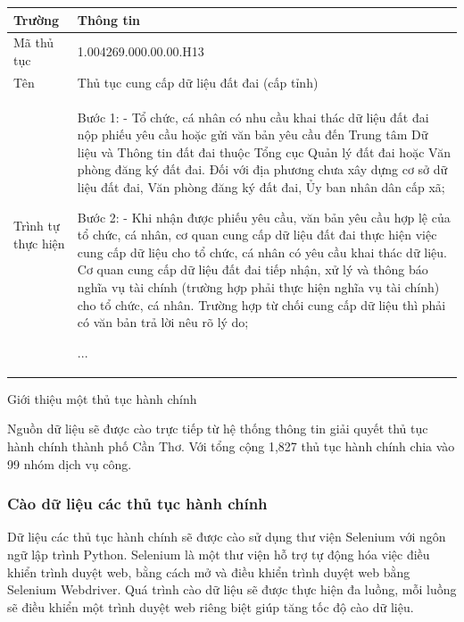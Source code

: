 \documentclass[a4paper, 12pt, openany]{book}
\begin{document}
\vspace{0.5cm}
\begin{minipage}{14cm}
    \begin{center}
        \begin{tabular}{ | m{3cm} | m{11cm}| } 
        \cline{1-2} 
        \hline
        \textbf{Trường} & \textbf{Thông tin}\\
        \hline Mã thủ tục & 1.004269.000.00.00.H13 \\
        \hline Tên & Thủ tục cung cấp dữ liệu đất đai (cấp tỉnh) \\
        \hline Trình tự thực hiện & 
                Bước 1:
                - Tổ chức, cá nhân có nhu cầu khai thác dữ liệu đất đai nộp phiếu yêu cầu hoặc gửi văn bản yêu cầu đến Trung tâm Dữ liệu và Thông tin đất đai thuộc Tổng cục Quản lý đất đai hoặc Văn phòng đăng ký đất đai. Đối với địa phương chưa xây dựng cơ sở dữ liệu đất đai, Văn phòng đăng ký đất đai, Ủy ban nhân dân cấp xã;

                Bước 2:
                - Khi nhận được phiếu yêu cầu, văn bản yêu cầu hợp lệ của tổ chức, cá nhân, cơ quan cung cấp dữ liệu đất đai thực hiện việc cung cấp dữ liệu cho tổ chức, cá nhân có yêu cầu khai thác dữ liệu. Cơ quan cung cấp dữ liệu đất đai tiếp nhận, xử lý và thông báo nghĩa vụ tài chính (trường hợp phải thực hiện nghĩa vụ tài chính) cho tổ chức, cá nhân. Trường hợp từ chối cung cấp dữ liệu thì phải có văn bản trả lời nêu rõ lý do;
                
                \begin{center}
                    ...
                \end{center}
                \\
        \hline
        \end{tabular}
    \end{center}
    \captionsetup{type=table}
    \caption{Giới thiệu một thủ tục hành chính}
\end{minipage}

Nguồn dữ liệu sẽ được cào trực tiếp từ hệ thống thông tin giải quyết thủ tục hành chính thành phố Cần Thơ.
Với tổng cộng 1,827 thủ tục hành chính chia vào 99 nhóm dịch vụ công.
\subsubsection{Cào dữ liệu các thủ tục hành chính}
Dữ liệu các thủ tục hành chính sẽ được cào sử dụng thư viện Selenium với ngôn ngữ lập trình Python. Selenium là một thư viện hỗ trợ tự động hóa việc điều khiển trình duyệt web, 
bằng cách mở và điều khiển trình duyệt web bằng Selenium Webdriver.
Quá trình cào dữ liệu sẽ được thực hiện đa luồng, mỗi luồng sẽ điều khiển một trình duyệt web riêng biệt giúp tăng tốc độ cào dữ liệu.
\end{document}
